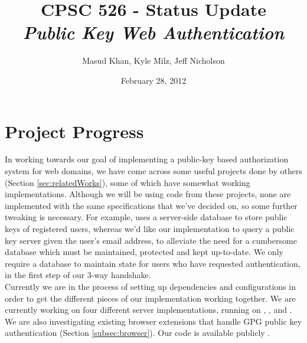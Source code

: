 \documentclass[11pt]{article}
\begin{document}
\title{\bf CPSC 526 - Status Update \\ \emph{Public Key Web Authentication}}
\author{Masud Khan, Kyle Milz, Jeff Nicholson}
\date{February 28, 2012}
\maketitle

\tableofcontents
\pagebreak

\section{Project Progress} \label{sec:progress}
In working towards our goal of implementing a public-key based authorization system for web domains, we have come across some useful projects done by others (Section \ref{sec:relatedWorks}), some of which have somewhat working implementations.  Although we will be using code from these projects, none are implemented with the same specifications that we've decided on, so some further tweaking is necessary.  For example,  uses a server-side database to store public keys of registered users, whereas we'd like our implementation to query a public key server given the user's email address, to alleviate the need for a cumbersome database which must be maintained, protected and kept up-to-date. We only require a database to maintain state for users who have requested authentication, in the first step of our 3-way handshake.\\
Currently we are in the process of setting up dependencies and configurations in order to get the different pieces of our implementation working together.  We are currently working on four different server implementations, running on , ,  and . We are also investigating existing browser extensions that handle GPG public key authentication (Section \ref{subsec:browser}). Our code is available publicly \cite{526proj}.\\
\end{document}
